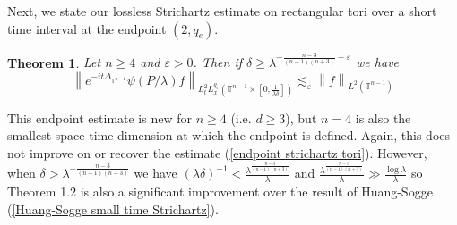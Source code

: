 \documentclass[11pt]{amsart}
\numberwithin{equation}{section}
\newcommand{\Tn}{\mathbb{T}^{n-1}}
\newcommand{\la}{\lambda}
\newcommand\norm[1]{\left\lVert#1\right\rVert}
\newcommand{\lpnorm}[3]{\norm{#1}_{L^{#2}(#3)}}
\newcommand{\mixlpnorm}[4]{\norm{#1}_{L^{#2}_{t} L^{#3}_{x}(#4)}}
\newcommand{\laplac}[1]{\Delta_{#1}}
\newtheorem{theorem}{Theorem}[section]
\begin{document}
Next, we state our lossless Strichartz estimate on rectangular tori over a short time interval at the endpoint $(2,q_e)$.
\begin{theorem}
    Let $n \geq 4$ and $\varepsilon > 0$. Then if $\delta \geq  \la^{-\frac{n-3}{(n-1)(n+3)} + \varepsilon}$ we have
    \begin{equation}
        \mixlpnorm{e^{-it\laplac{\Tn}}\psi(P/\la)f}{2}{q_e}{\Tn \times [0,\frac{1}{\la \delta}]} \lesssim_{\varepsilon} \lpnorm{f}{2}{\Tn}
    \end{equation}
\end{theorem}
\noindent
This endpoint estimate is new for $n \geq 4$ (i.e. $d \geq 3$), but $n=4$ is also the smallest space-time dimension at which the endpoint is defined. Again, this does not improve on or recover the estimate (\ref{endpoint strichartz tori}). However, when $\delta > \la^{-\frac{n-3}{(n-1)(n+3)}}$ we have $(\la \delta)^{-1} < \frac{\la^{\frac{n-3}{(n-1)(n+3)}}}{\la}$ and $\frac{\la^{\frac{n-3}{(n-1)(n+3)}}}{\la}  \gg \frac{\log\la}{\la}$ so Theorem 1.2 is also a significant improvement over the result of Huang-Sogge (\ref{Huang-Sogge small time Strichartz}).
\end{document}
